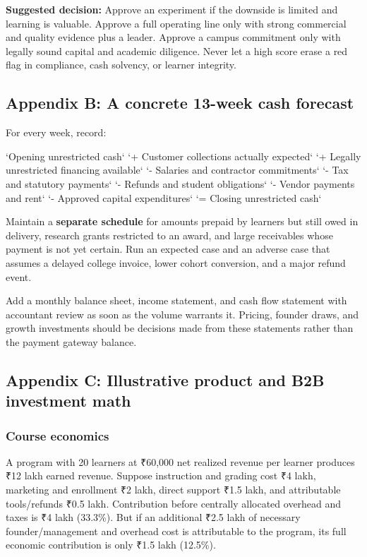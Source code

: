 \textbf{Suggested decision:} Approve an experiment if the downside is limited and learning is valuable. Approve a full operating line only with strong commercial and quality evidence plus a leader. Approve a campus commitment only with legally sound capital and academic diligence. Never let a high score erase a red flag in compliance, cash solvency, or learner integrity.

\subsection{Appendix B: A concrete 13-week cash forecast}

For every week, record:

`Opening unrestricted cash`
`+ Customer collections actually expected`
`+ Legally unrestricted financing available`
`- Salaries and contractor commitments`
`- Tax and statutory payments`
`- Refunds and student obligations`
`- Vendor payments and rent`
`- Approved capital expenditures`
`= Closing unrestricted cash`

Maintain a \textbf{separate schedule} for amounts prepaid by learners but still owed in delivery, research grants restricted to an award, and large receivables whose payment is not yet certain. Run an expected case and an adverse case that assumes a delayed college invoice, lower cohort conversion, and a major refund event.

Add a monthly balance sheet, income statement, and cash flow statement with accountant review as soon as the volume warrants it. Pricing, founder draws, and growth investments should be decisions made from these statements rather than the payment gateway balance.

\subsection{Appendix C: Illustrative product and B2B investment math}

\subsubsection*{Course economics}

A program with 20 learners at \textnormal{₹}60,000 net realized revenue per learner produces \textnormal{₹}12 lakh earned revenue. Suppose instruction and grading cost \textnormal{₹}4 lakh, marketing and enrollment \textnormal{₹}2 lakh, direct support \textnormal{₹}1.5 lakh, and attributable tools/\allowbreak refunds \textnormal{₹}0.5 lakh. Contribution before centrally allocated overhead and taxes is \textnormal{₹}4 lakh (33.3\%). But if an additional \textnormal{₹}2.5 lakh of necessary founder/\allowbreak management and overhead cost is attributable to the program, its full economic contribution is only \textnormal{₹}1.5 lakh (12.5\%).

